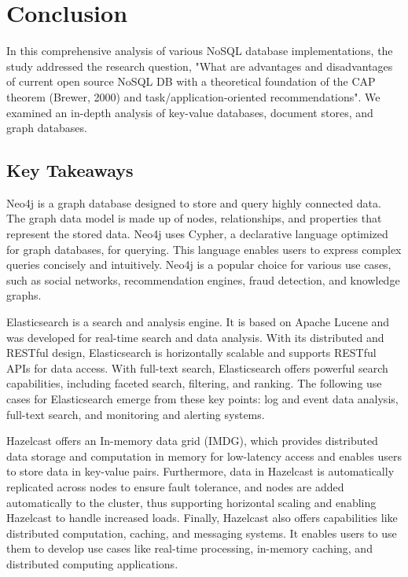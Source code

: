 
\chapter{Conclusion} \label{ch:conclusion}

In this comprehensive analysis of various NoSQL database implementations, the study addressed the research question, "What are advantages and disadvantages of current open source NoSQL DB with a theoretical foundation of the CAP theorem (Brewer, 2000) and task/application-oriented recommendations". We examined an in-depth analysis of key-value databases, document stores, and graph databases.
\section*{Key Takeaways}
Neo4j is a graph database designed to store and query highly connected data. The graph data model is made up of nodes, relationships, and properties that represent the stored data. Neo4j uses Cypher, a declarative language optimized for graph databases, for querying. This language enables users to express complex queries concisely and intuitively. Neo4j is a popular choice for various use cases, such as social networks, recommendation engines, fraud detection, and knowledge graphs.

Elasticsearch is a search and analysis engine. It is based on Apache Lucene and was developed for real-time search and data analysis. With its distributed and RESTful design, Elasticsearch is horizontally scalable and supports RESTful APIs for data access. With full-text search, Elasticsearch offers powerful search capabilities, including faceted search, filtering, and ranking. The following use cases for Elasticsearch emerge from these key points: log and event data analysis, full-text search, and monitoring and alerting systems.

Hazelcast offers an In-memory data grid (IMDG), which provides distributed data storage and computation in memory for low-latency access and enables users to store data in key-value pairs. Furthermore, data in Hazelcast is automatically replicated across nodes to ensure fault tolerance, and nodes are added automatically to the cluster, thus supporting horizontal scaling and enabling Hazelcast to handle increased loads. Finally, Hazelcast also offers capabilities like distributed computation, caching, and messaging systems. It enables users to use them to develop use cases like real-time processing, in-memory caching, and distributed computing applications. 

